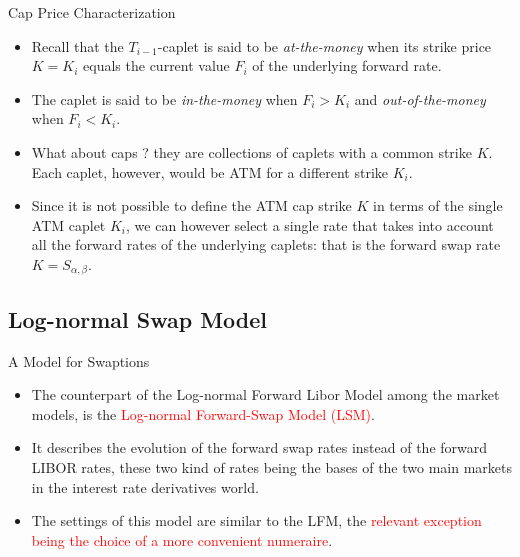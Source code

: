 \documentclass{beamer}
\begin{document}
\begin{frame}{Cap Price Characterization}
	\begin{itemize}
		\item Recall that the $T_{i-1}$-caplet is said to be \emph{at-the-money} when its strike price $K = K_i$ equals the current value $F_i$ of the underlying forward rate. 
		\item The caplet is said to be \emph{in-the-money} when $F_i > K_i$ and \emph{out-of-the-money} when $F_i < K_i$.
		\item What about caps ? they are collections of caplets with a common strike $K$. Each caplet, however, would be ATM for a different strike $K_i$. \item Since it is not possible to define the ATM cap strike $K$ in terms of the single ATM caplet $K_i$, we can however select a single rate that takes into account all the forward rates of the underlying caplets: that is the forward swap rate $K = S_{\alpha,\beta}$.
	\end{itemize}
\end{frame}

\subsection{Log-normal Swap Model}
\begin{frame}{A Model for Swaptions}
  \begin{itemize}
  \item<1-> The counterpart of the Log-normal Forward Libor Model among the market models, is the \textcolor{red}{Log-normal Forward-Swap Model (LSM)}.
  \item<2-> It describes the evolution of the forward swap rates instead of the forward LIBOR rates, these two kind of rates being the bases of the two main markets in the interest rate derivatives world. 
  \item<3-> The settings of this model are similar to the LFM, the \textcolor{red}{relevant exception being the choice of a more convenient numeraire}.
  \end{itemize}
\end{frame}
\end{document}
